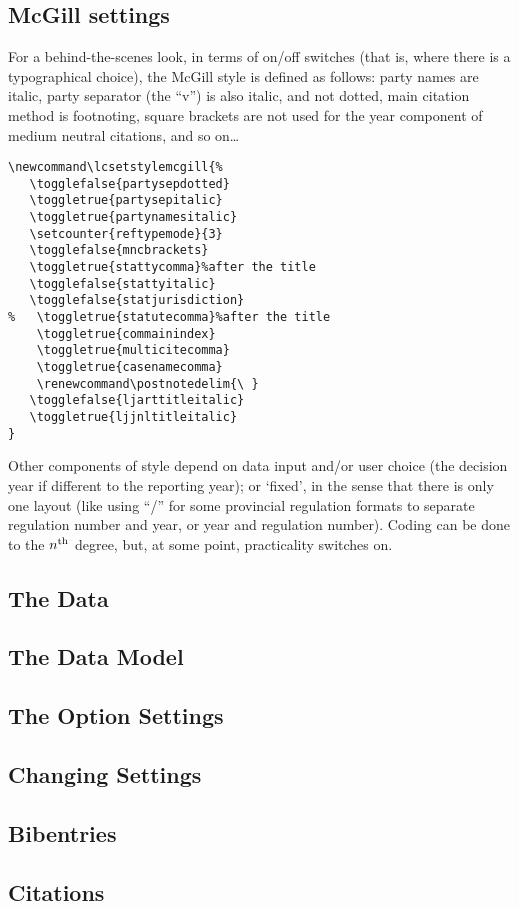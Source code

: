 \subsection{McGill settings}
For a behind-the-scenes look, in terms of on/off switches (that is, where there is a typographical choice), the McGill style is defined as follows: party names are italic, party separator (the ``v'') is also italic, and not dotted, main citation method is footnoting, square brackets are not used for the year component of medium neutral citations, and so on\ldots
\begin{verbatim}
\newcommand\lcsetstylemcgill{%
   \togglefalse{partysepdotted}
   \toggletrue{partysepitalic}
   \toggletrue{partynamesitalic}
   \setcounter{reftypemode}{3}
   \togglefalse{mncbrackets}
   \toggletrue{stattycomma}%after the title
   \togglefalse{stattyitalic}
   \togglefalse{statjurisdiction}
%   \toggletrue{statutecomma}%after the title
	\toggletrue{commainindex}
	\toggletrue{multicitecomma}
	\toggletrue{casenamecomma}
	\renewcommand\postnotedelim{\ }
   \togglefalse{ljarttitleitalic}
   \toggletrue{ljjnltitleitalic}
}
\end{verbatim}
\bigskip
Other components of style depend on data input and/or user choice (the decision year if different to the reporting year); or `fixed', in the sense that there is only one layout (like using ``/'' for some provincial regulation formats to separate regulation number and year, or year and regulation number). Coding can be done to the $n\textsuperscript{th}$ degree, but, at some point, practicality switches on.
\subsection{The Data}
\subsection{The Data Model}
\subsection{The Option Settings}
\subsection{Changing Settings}
\subsection{Bibentries}
\subsection{Citations}
